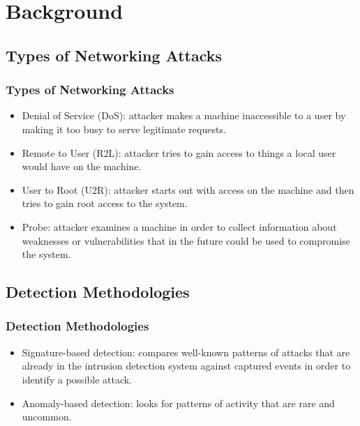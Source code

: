 \documentclass{beamer}
\newcommand{\linespace}{\vskip 0.25cm}
\begin{document}
\section[Background]{Background}
\subsection{Types of Networking Attacks}
\begin{frame}
  \frametitle{Types of Networking Attacks}
  \begin{itemize}
  	\item Denial of Service (DoS): attacker makes a machine inaccessible to a user by making it too busy to serve legitimate requests.

  	\linespace
  	\linespace

  	\item Remote to User (R2L): attacker tries to gain access to things a local user would have on the machine.

  	\linespace
  	\linespace
  	
  	\item User to Root (U2R): attacker starts out with access on the machine and then tries to gain root access to the system.

  	\linespace
  	\linespace
  	
  	\item Probe: attacker examines a machine in order to collect information about weaknesses or vulnerabilities that in the future could be used to compromise the system.
  \end{itemize}
\end{frame}


\subsection{Detection Methodologies}
\begin{frame}
  \frametitle{Detection Methodologies}
  \begin{itemize}
  	\item Signature-based detection: compares well-known patterns of attacks that are already in the intrusion detection system against captured events in order to identify a possible attack.
  	\item Anomaly-based detection: looks for patterns of activity that are rare and uncommon.
  \end{itemize}
\end{frame}
\end{document}
